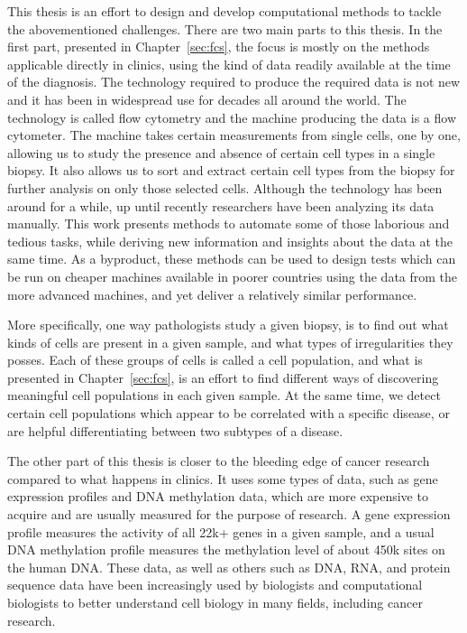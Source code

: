 This thesis is an effort to design and develop computational methods to tackle
the abovementioned challenges. There are two main parts to this thesis. In the
first part, presented in Chapter~\ref{sec:fcs}, the focus is mostly on the
methods applicable directly in clinics, using the kind of data readily available
at the time of the diagnosis. The technology required to produce the required
data is not new and it has been in widespread use for decades all around the
world. The technology is called flow cytometry and the machine producing the
data is a flow cytometer. The machine takes certain measurements from single
cells, one by one, allowing us to study the presence and absence of certain cell
types in a single biopsy. It also allows us to sort and extract certain cell
types from the biopsy for further analysis on only those selected cells.
Although the technology has been around for a while, up until recently
researchers have been analyzing its data manually. This work presents methods to
automate some of those laborious and tedious tasks, while deriving new
information and insights about the data at the same time. As a byproduct, these
methods can be used to design tests which can be run on cheaper machines
available in poorer countries using the data from the more advanced machines,
and yet deliver a relatively similar performance.

More specifically, one way pathologists study a given biopsy, is to find out
what kinds of cells are present in a given sample, and what types of
irregularities they posses. Each of these groups of cells is called a cell
population, and what is presented in Chapter~\ref{sec:fcs}, is an effort to find
different ways of discovering meaningful cell populations in each given sample.
At the same time, we detect certain cell populations which appear to be
correlated with a specific disease, or are helpful differentiating between
two subtypes of a disease.

The other part of this thesis is closer to the bleeding edge of cancer research
compared to what happens in clinics. It uses some types of data, such as gene
expression profiles and DNA methylation data, which are more expensive to
acquire and are usually measured for the purpose of research. A gene expression
profile measures the activity of all 22k+ genes in a given sample, and a usual
DNA methylation profile measures the methylation level of about 450k sites on
the human DNA. These data, as well as others such as DNA, RNA, and protein
sequence data have been increasingly used by biologists and computational
biologists to better understand cell biology in many fields, including cancer
research.

